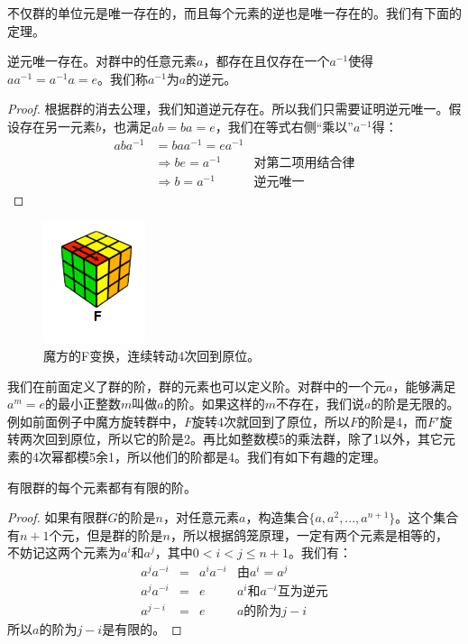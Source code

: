 \documentclass[b5paper]{ctexart}
\begin{document}
不仅群的单位元是唯一存在的，而且每个元素的逆也是唯一存在的。我们有下面的定理。

\begin{theorem}
逆元唯一存在。对群中的任意元素$a$，都存在且仅存在一个$a^{-1}$使得$aa^{-1} = a^{-1}a = e$。我们称$a^{-1}$为$a$的逆元。
\end{theorem}

\begin{proof}
根据群的消去公理，我们知道逆元存在。所以我们只需要证明逆元唯一。假设存在另一元素$b$，也满足$ab = ba = e$，我们在等式右侧“乘以”$a^{-1}$得：
\[
\begin{array}{rll}
aba^{-1} & = baa^{-1} = ea^{-1} & \\
& \Rightarrow be = a^{-1} & \text{对第二项用结合律} \\
& \Rightarrow b = a^{-1} & \text{逆元唯一}
\end{array}
\]
\end{proof}

\begin{figure}[htbp]
 \centering
 \includegraphics[scale=1.0]{img/Rubik-cube-F.png}
 \caption{魔方的F变换，连续转动4次回到原位。}
 \label{fig:Rubik-cube-F}
\end{figure}

我们在前面定义了群的阶，群的元素也可以定义阶。对群中的一个元$a$，能够满足$a^m = e$的最小正整数$m$叫做$a$的阶。如果这样的$m$不存在，我们说$a$的阶是无限的。例如前面例子中魔方旋转群中，$F$旋转4次就回到了原位，所以$F$的阶是4，而$F'$旋转两次回到原位，所以它的阶是2。再比如整数模5的乘法群，除了1以外，其它元素的4次幂都模5余1，所以他们的阶都是4。我们有如下有趣的定理。

\begin{theorem}
有限群的每个元素都有有限的阶。
\end{theorem}

\begin{proof}
如果有限群$G$的阶是$n$，对任意元素$a$，构造集合$\{a, a^2, ..., a^{n+1}\}$。这个集合有$n+1$个元，但是群的阶是$n$，所以根据鸽笼原理，一定有两个元素是相等的， 不妨记这两个元素为$a^i$和$a^j$，其中$0 < i < j \leq n + 1$。我们有：
\[
\begin{array}{rcll}
a^ja^{-i} & = & a^{i}a^{-i} & \text{由} a^i = a^j \\
a^ja^{-i} & = & e & \text{$a^i$和$a^{-i}$互为逆元} \\
a^{j-i} & = & e & a\text{的阶为} j - i
\end{array}
\]
所以$a$的阶为$j-i$是有限的。
\end{proof}
\end{document}
